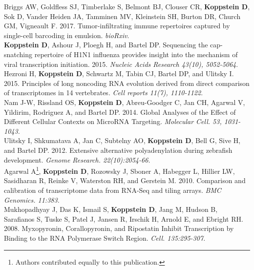 \documentclass[10pt,a4paper]{article}
\begin{document}
{\noindent Briggs AW, Goldfless SJ, Timberlake S, Belmont BJ, Clouser CR, \textbf{Koppstein D}, Sok D, Vander Heiden JA, Tamminen MV, Kleinstein SH, Burton DR, Church GM, Vigneault F. 2017. Tumor-infiltrating immune repertoires captured by single-cell barcoding in emulsion. \textit{bioRxiv}. \vspace{0.5em} \\
{\noindent \textbf{Koppstein D}, Ashour J, Ploegh H, and Bartel DP. Sequencing the cap-snatching repertoire of H1N1
influenza provides insight into the mechanism of viral transcription initiation. 2015. \textit{Nucleic Acids Research 43(10), 5052-5064}.} \vspace{0.05em} \\
{\noindent Hezroni H, \textbf{Koppstein D}, Schwartz M, Tabin CJ, Bartel DP, and Ulitsky I. 2015. Principles of long noncoding
RNA evolution derived from direct comparison of transcriptomes in 14 vertebrates. \textit{Cell reports 11(7), 1110-1122}}. \vspace{0.3em} \\
{\noindent Nam J-W, Rissland OS, \textbf{Koppstein D}, Abreu-Goodger C, Jan CH, Agarwal V, Yildirim, Rodriguez A, and Bartel DP. 2014. Global Analyses of the Effect of Different Cellular Contexts on MicroRNA Targeting. \textit{Molecular Cell. 53, 1031-1043.}} \vspace{0.3em} \\
{\noindent Ulitsky I, Shkumatava A, Jan C, Subtelny AO, \textbf{Koppstein D}, Bell G, Sive H, and Bartel DP. 2012. Extensive alternative polyadenylation during zebrafish development. \textit{Genome Research. 22(10):2054-66.}} \vspace{0.3em} \\
{\noindent Agarwal A\footnote[1]{Authors contributed equally to this publication.}, \textbf{Koppstein D}\footnotemark[1], Rozowsky J, Sboner A, Habegger L, Hillier LW, Sasidharan R, Reinke V, Waterston RH, and Gerstein M. 2010. Comparison and calibration of transcriptome data from RNA-Seq and tiling arrays. \textit{BMC Genomics. 11:383.}} \vspace{0.3em} \\
{\noindent Mukhopadhyay J, Das K, Ismail S, \textbf{Koppstein D}, Jang M, Hudson B, Sarafianos S, Tuske S, Patel J, Jansen R, Irschik H, Arnold E, and Ebright RH. 2008. Myxopyronin, Corallopyronin, and Ripostatin Inhibit Transcription by Binding to the RNA Polymerase Switch Region. \textit{Cell. 135:295-307.}} \vspace{0.3em} \\


}
\end{document}

